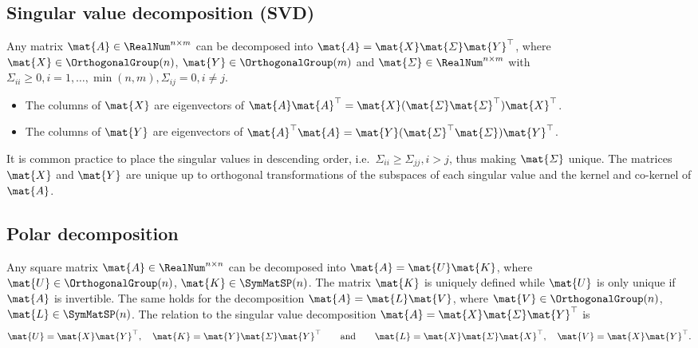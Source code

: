 \subsection{Singular value decomposition (SVD)}
Any matrix $\mat{A} \in \RealNum^{n\times m}$ can be decomposed into $\mat{A} = \mat{X} \mat{\varSigma} \mat{Y}^\top$, where $\mat{X} \in \OrthogonalGroup(n)$, $\mat{Y} \in \OrthogonalGroup(m)$ and $\mat{\varSigma} \in \RealNum^{n\times m}$ with $\varSigma_{ii} \geq 0, i=1,\ldots,\min(n,m), \varSigma_{ij} = 0, i\neq j$.
\begin{itemize}
 \item The columns of $\mat{X}$ are eigenvectors of $\mat{A} \mat{A}^\top = \mat{X} (\mat{\varSigma} \mat{\varSigma}^\top) \mat{X}^\top$.
 \item The columns of $\mat{Y}$ are eigenvectors of $\mat{A}^\top \mat{A} = \mat{Y} (\mat{\varSigma}^\top \mat{\varSigma}) \mat{Y}^\top$.
\end{itemize}
It is common practice to place the singular values in descending order, i.e.\ $\varSigma_{ii} \geq \varSigma_{jj}, i > j$, thus making $\mat{\varSigma}$ unique.
The matrices $\mat{X}$ and $\mat{Y}$ are unique up to orthogonal transformations of the subspaces of each singular value and the kernel and co-kernel of $\mat{A}$.

\subsection{Polar decomposition}
Any square matrix $\mat{A} \in \RealNum^{n\times n}$ can be decomposed into $\mat{A} = \mat{U} \mat{K}$, where $\mat{U} \in \OrthogonalGroup(n)$, $\mat{K} \in \SymMatSP(n)$.
The matrix $\mat{K}$ is uniquely defined while $\mat{U}$ is only unique if $\mat{A}$ is invertible.
The same holds for the decomposition $\mat{A} = \mat{L} \mat{V}$, where $\mat{V} \in \OrthogonalGroup(n)$, $\mat{L} \in \SymMatSP(n)$.
The relation to the singular value decomposition $\mat{A} = \mat{X} \mat{\varSigma} \mat{Y}^\top$ is
\begin{align}
 \mat{U} = \mat{X} \mat{Y}^\top, \quad \mat{K} = \mat{Y} \mat{\varSigma} \mat{Y}^\top
\qquad \text{and} \qquad
 \mat{L} = \mat{X} \mat{\varSigma} \mat{X}^\top, \quad \mat{V} = \mat{X} \mat{Y}^\top.
\end{align}

